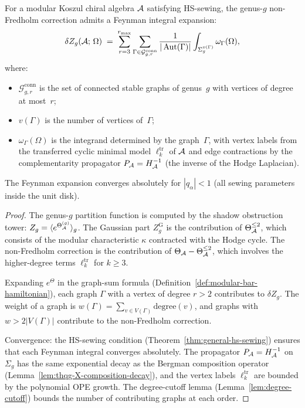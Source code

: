 \begin{theorem}%
\label{thm:thqg-X-feynman-expansion}%
%
For a modular Koszul chiral algebra $\mathcal{A}$ satisfying HS-sewing,
the genus-$g$ non-Fredholm correction admits a Feynman integral
expansion:
\begin{equation}\label{eq:thqg-X-feynman-expansion}
\delta Z_g(\mathcal{A};\,\Omega)
\;=\;
\sum_{r=3}^{r_{\max}}
\sum_{\Gamma \in \mathcal{G}^{\mathrm{conn}}_{g,r}}
\frac{1}{|\operatorname{Aut}(\Gamma)|}
\int_{\Sigma_g^{v(\Gamma)}}
\omega_\Gamma(\Omega),
\end{equation}
where:
\begin{itemize}
\item $\mathcal{G}^{\mathrm{conn}}_{g,r}$ is the set of
 connected stable graphs of genus~$g$ with vertices of
 degree at most~$r$;
\item $v(\Gamma)$ is the number of vertices of~$\Gamma$;
\item $\omega_\Gamma(\Omega)$ is the integrand determined by
 the graph~$\Gamma$, with vertex labels from the transferred
 cyclic minimal model $\ell_k^{\mathrm{tr}}$ of $\mathcal{A}$ and
 edge contractions by the complementarity propagator
 $P_{\mathcal{A}} = H_{\mathcal{A}}^{-1}$ (the inverse of the Hodge Laplacian).
\end{itemize}
The Feynman expansion converges absolutely for $|q_\alpha| < 1$
(all sewing parameters inside the unit disk).
\end{theorem}

\begin{proof}
The genus-$g$ partition function is computed by the shadow
obstruction tower: $Z_g = \langle e^{\Theta_{\mathcal{A}}^{(g)}} \rangle_g$.
The Gaussian part $Z_g^{\mathrm{G}}$ is the contribution of
$\Theta_{\mathcal{A}}^{\leq 2}$, which consists of the modular
characteristic $\kappa$ contracted with the Hodge cycle.
The non-Fredholm correction is the contribution of
$\Theta_{\mathcal{A}} - \Theta_{\mathcal{A}}^{\leq 2}$, which involves the
higher-degree terms $\ell_k^{\mathrm{tr}}$ for $k \geq 3$.

Expanding $e^{\Theta}$ in the graph-sum formula
(Definition~\ref{def:modular-bar-hamiltonian}), each
graph $\Gamma$ with a vertex of degree $r > 2$ contributes to
$\delta Z_g$. The weight of a graph is
$w(\Gamma) = \sum_{v \in V(\Gamma)} \mathrm{degree}(v)$,
and graphs with $w > 2|V(\Gamma)|$ contribute to the
non-Fredholm correction.

Convergence: the HS-sewing condition
(Theorem~\ref{thm:general-hs-sewing}) ensures that each
Feynman integral converges absolutely. The propagator
$P_{\mathcal{A}} = H_{\mathcal{A}}^{-1}$ on $\Sigma_g$ has the same exponential
decay as the Bergman composition operator
(Lemma~\ref{lem:thqg-X-composition-decay}), and the vertex
labels $\ell_k^{\mathrm{tr}}$ are bounded by the polynomial
OPE growth. The degree-cutoff lemma (Lemma~\ref{lem:degree-cutoff})
bounds the number of contributing graphs at each order.
\end{proof}


